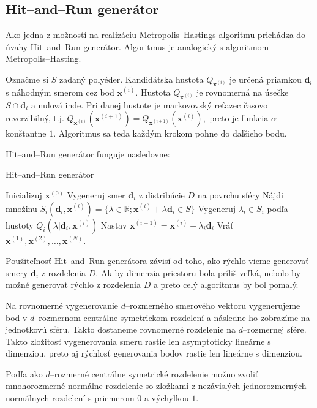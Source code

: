 \subsection{Hit--and--Run generátor}

Ako jedna z možností na realizáciu Metropolis--Hastings algoritmu prichádza do úvahy Hit--and--Run generátor. Algoritmus je analogický s algoritmom Metropolis--Hasting.

Označme si $S$ zadaný polyéder. Kandidátska hustota $Q_{\mathbf x^{(i)}}$ je určená priamkou $\mathbf d_i$ s náhodným smerom cez bod $\mathbf x^{(i)}$. Hustota $Q_{\mathbf x^{(i)}}$ je rovnomerná na úsečke $S \cap \mathbf d_i$ a nulová inde. Pri danej hustote je markovovský reťazec časovo reverzibilný, t.j. $Q_{\mathbf x^{(i)}}(\mathbf x^{(i+1)})=Q_{\mathbf x^{(i+1)}}(\mathbf x^{(i)}),$ \cite{hit-and-run_chen} preto je funkcia $\alpha$ konštantne $1$. Algoritmus sa teda každým krokom pohne do ďalšieho bodu.

Hit--and--Run generátor funguje nasledovne:

\begin{algorithm}[H]
	\caption{Hit--and--Run generátor \cite{hit-and-run_chen}}
	\label{hit--and--run}
	\begin{algorithmic}[1]
		\State Inicializuj $\mathbf x^{(0)}$
			\State Vygeneruj smer $\mathbf d_i$ z distribúcie $D$ na povrchu sféry
			\State Nájdi množinu $S_i(\mathbf d_i,\mathbf x^{(i)})=\{\lambda \in \mathbb{R}; \mathbf x^{(i)} + \lambda \mathbf d_i \in S \} $
			\State Vygeneruj $\lambda_i \in S_i$ podľa hustoty $Q_i(\lambda | \mathbf d_i, \mathbf x^{(i)})$
			\State Nastav $\mathbf x^{(i+1)}=\mathbf x^{(i)}+\lambda_i \mathbf d_i$
		\EndFor
		\State Vráť $\mathbf x^{(1)},\mathbf x^{(2)},\dots,\mathbf x^{(N)}$.
	\end{algorithmic}
\end{algorithm}

Použiteľnosť Hit--and--Run generátora závisí od toho, ako rýchlo vieme generovať smery $\mathbf d_i$ z rozdelenia $D$. Ak by dimenzia priestoru bola príliš veľká, nebolo by možné generovať rýchlo z rozdelenia $D$ a preto celý algoritmus by bol pomalý. 

Na rovnomerné vygenerovanie $d$--rozmerného smerového vektoru vygenerujeme bod v $d$--rozmernom centrálne symetrickom rozdelení a následne ho zobrazíme na jednotkovú sféru. Takto dostaneme rovnomerné rozdelenie na $d$--rozmernej sfére. Takto zložitosť vygenerovania smeru rastie len asymptoticky lineárne s dimenziou, preto aj rýchlosť generovania bodov rastie len lineárne s dimenziou.

Podľa \cite{decompositional_harman} ako $d$--rozmerné centrálne symetrické rozdelenie možno zvoliť mnohorozmerné normálne rozdelenie so zložkami z nezávislých jednorozmerných normálnych rozdelení s priemerom $0$ a výchylkou $1$.
